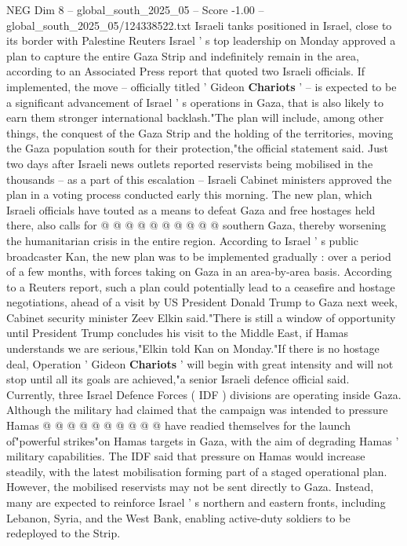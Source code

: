 \begin{textsample}{NEG Dim 8 – global\_south\_2025\_05 – Score -1.00 – global\_south\_2025\_05/124338522.txt}  \label{ex:f8_neg_017}
Israeli tanks positioned in Israel, close to its border with Palestine Reuters Israel ' s top leadership on Monday approved a plan to capture the entire Gaza Strip and indefinitely remain in the area, according to an Associated Press report that quoted two Israeli officials.
If implemented, the move -- officially titled ' Gideon \textbf{Chariots} ' -- is expected to be a significant advancement of Israel ' s operations in Gaza, that is also likely to earn them stronger international backlash."The plan will include, among other things, the conquest of the Gaza Strip and the holding of the territories, moving the Gaza population south for their protection,"the official statement said.
Just two days after Israeli news outlets reported reservists being mobilised in the thousands -- as a part of this escalation -- Israeli Cabinet ministers approved the plan in a voting process conducted early this morning.
The new plan, which Israeli officials have touted as a means to defeat Gaza and free hostages held there, also calls for @ @ @ @ @ @ @ @ @ @ southern Gaza, thereby worsening the humanitarian crisis in the entire region.
According to Israel ' s public broadcaster Kan, the new plan was to be implemented gradually : over a period of a few months, with forces taking on Gaza in an area-by-area basis.
According to a Reuters report, such a plan could potentially lead to a ceasefire and hostage negotiations, ahead of a visit by US President Donald Trump to Gaza next week, Cabinet security minister Zeev Elkin said."There is still a window of opportunity until President Trump concludes his visit to the Middle East, if Hamas understands we are serious,"Elkin told Kan on Monday."If there is no hostage deal, Operation ' Gideon \textbf{Chariots} ' will begin with great intensity and will not stop until all its goals are achieved,"a senior Israeli defence official said.
Currently, three Israel Defence Forces ( IDF ) divisions are operating inside Gaza.
Although the military had claimed that the campaign was intended to pressure Hamas @ @ @ @ @ @ @ @ @ @ have readied themselves for the launch of"powerful strikes"on Hamas targets in Gaza, with the aim of degrading Hamas ' military capabilities.
The IDF said that pressure on Hamas would increase steadily, with the latest mobilisation forming part of a staged operational plan.
However, the mobilised reservists may not be sent directly to Gaza.
Instead, many are expected to reinforce Israel ' s northern and eastern fronts, including Lebanon, Syria, and the West Bank, enabling active-duty soldiers to be redeployed to the Strip.

\end{textsample}
